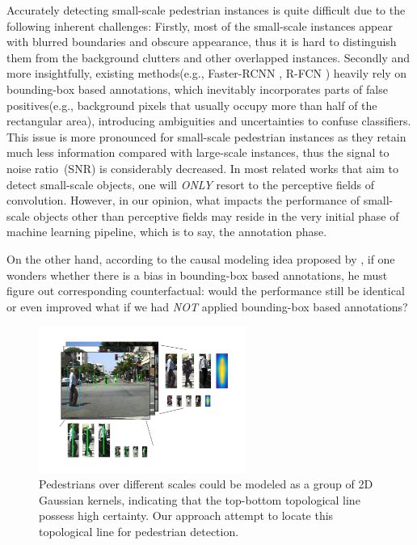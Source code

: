 \documentclass[runningheads]{llncs}
\begin{document}
Accurately detecting small-scale pedestrian instances is quite difficult due to the following inherent challenges: Firstly, most of the small-scale instances appear with blurred boundaries and obscure appearance, thus it is hard to distinguish them from the background clutters and other overlapped instances. Secondly and more insightfully, existing methods(e.g., Faster-RCNN \cite{FRCNN}, R-FCN \cite{RFCN}) heavily rely on bounding-box based annotations, which inevitably incorporates parts of false positives(e.g., background pixels that usually occupy more than half of the rectangular area), introducing ambiguities and uncertainties to confuse classifiers. This issue is more pronounced for small-scale pedestrian instances as they retain much less information compared with large-scale instances, thus the signal to noise ratio~(SNR) is considerably decreased. In most related works \cite{FRCNNPD,SAFRCNN,MSCNN} that aim to detect small-scale objects, one will \emph{ONLY} resort to the perceptive fields of convolution. However, in our opinion, what impacts the performance of small-scale objects other than perceptive fields may reside in the very initial phase of machine learning pipeline, which is to say, the annotation phase.

On the other hand, according to the causal modeling idea proposed by \cite{CounterFact}, if one wonders whether there is a bias in bounding-box based annotations, he must figure out corresponding counterfactual: would the performance still be identical or even improved what if we had \emph{NOT} applied bounding-box based annotations?
\begin{figure}[t]
	\centering
	\includegraphics[height=4.8cm]{1_annotation.pdf}
	\caption{Pedestrians over different scales could be modeled as a group of 2D Gaussian kernels, indicating that the top-bottom topological line possess high certainty. Our approach attempt to locate this topological line for pedestrian detection.}
	\label{fig1}
\end{figure}
\end{document}
